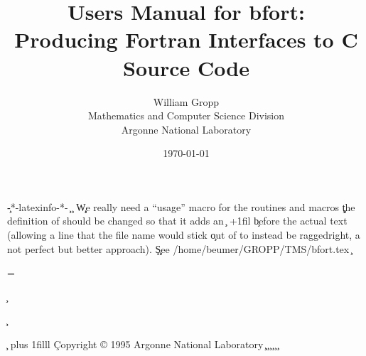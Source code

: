 \c -*-latexinfo-*-
\c \anltmtrue
\anltmfalse
\c\pagestyle{empty}
\c
\c We really need a ``usage'' macro for the routines and macros
\def\usage#1{}
\c
\c the definition of \file should be changed so that it adds an
\c {}\hskip 0pt +1fil 
\c before the actual text (allowing a line that the file name would stick
\c out of to instead be raggedright, a not perfect but better approach).
\c
\c
\c See /home/beumer/GROPP/TMS/bfort.tex
\c
\let\DOESupport\DefaultSupport

\def\tie{\nobreak\ \nobreak}
\def\bw{{\tt\char`\\}}

\textheight=9in
\textwidth=6.5in
\oddsidemargin=0in
\evensidemargin=0in
\topmargin=-0.5in
\hsize=\textwidth




\begin{ifinfo}
\c %
\title{Users Manual for bfort:\\
Producing Fortran Interfaces to C Source Code}
\author{William Gropp\\
Mathematics and Computer Science Division\\
Argonne National Laboratory}

\date{\today}

\c %

\maketitle
\end{ifinfo}

\begin{iftex}

\end{iftex}

\clearpage

\c \vskip 0pt plus 1filll
\c Copyright \copyright{} 1995 Argonne National Laboratory
\c
\c \clearpage
\c {}
\c \setcounter{page}{3}
\c \pagestyle{plain}
\c \tableofcontents
\c \clearpage

\pagestyle{plain}
\thispagestyle{plain}

